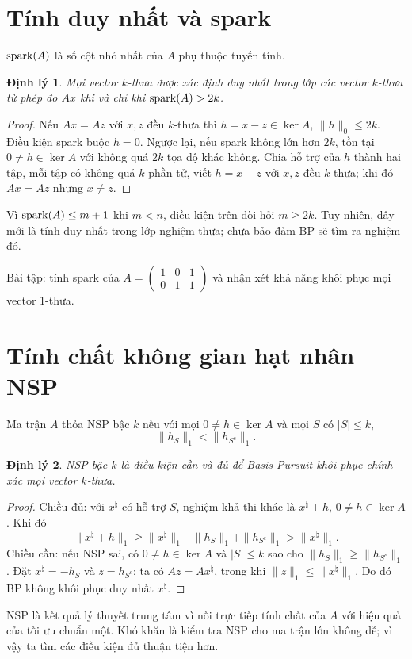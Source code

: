 \documentclass[12pt,a4paper]{article}
\newtheorem{theorem}{Định lý}[section]\newtheorem{lemma}[theorem]{Bổ đề}
\begin{document}
\section{Tính duy nhất và spark}
$\operatorname{spark}(A)$ là số cột nhỏ nhất của $A$ phụ thuộc tuyến tính.
\begin{theorem}Mọi vector $k$-thưa được xác định duy nhất trong lớp các vector $k$-thưa từ phép đo $Ax$ khi và chỉ khi $\operatorname{spark}(A)>2k$.\end{theorem}
\begin{proof}Nếu $Ax=Az$ với $x,z$ đều $k$-thưa thì $h=x-z\in\ker A$, $\|h\|_0\le2k$. Điều kiện spark buộc $h=0$. Ngược lại, nếu spark không lớn hơn $2k$, tồn tại $0\ne h\in\ker A$ với không quá $2k$ tọa độ khác không. Chia hỗ trợ của $h$ thành hai tập, mỗi tập có không quá $k$ phần tử, viết $h=x-z$ với $x,z$ đều $k$-thưa; khi đó $Ax=Az$ nhưng $x\ne z$.\end{proof}

Vì $\operatorname{spark}(A)\le m+1$ khi $m<n$, điều kiện trên đòi hỏi $m\ge2k$. Tuy nhiên, đây mới là tính duy nhất trong lớp nghiệm thưa; chưa bảo đảm BP sẽ tìm ra nghiệm đó.

Bài tập: tính spark của $A=\begin{pmatrix}1&0&1\\0&1&1\end{pmatrix}$ và nhận xét khả năng khôi phục mọi vector 1-thưa.
\clearpage
\section{Tính chất không gian hạt nhân NSP}
Ma trận $A$ thỏa NSP bậc $k$ nếu với mọi $0\ne h\in\ker A$ và mọi $S$ có $|S|\le k$,
\[\|h_S\|_1<\|h_{S^c}\|_1.\]
\begin{theorem}NSP bậc $k$ là điều kiện cần và đủ để Basis Pursuit khôi phục chính xác mọi vector $k$-thưa.\end{theorem}
\begin{proof}Chiều đủ: với $x^\natural$ có hỗ trợ $S$, nghiệm khả thi khác là $x^\natural+h$, $0\ne h\in\ker A$. Khi đó
\[\|x^\natural+h\|_1\ge\|x^\natural\|_1-\|h_S\|_1+\|h_{S^c}\|_1>\|x^\natural\|_1.\]
Chiều cần: nếu NSP sai, có $0\ne h\in\ker A$ và $|S|\le k$ sao cho $\|h_S\|_1\ge\|h_{S^c}\|_1$. Đặt $x^\natural=-h_S$ và $z=h_{S^c}$; ta có $Az=Ax^\natural$, trong khi $\|z\|_1\le\|x^\natural\|_1$. Do đó BP không khôi phục duy nhất $x^\natural$.\end{proof}

NSP là kết quả lý thuyết trung tâm vì nối trực tiếp tính chất của $A$ với hiệu quả của tối ưu chuẩn một. Khó khăn là kiểm tra NSP cho ma trận lớn không dễ; vì vậy ta tìm các điều kiện đủ thuận tiện hơn.
\clearpage
\end{document}
